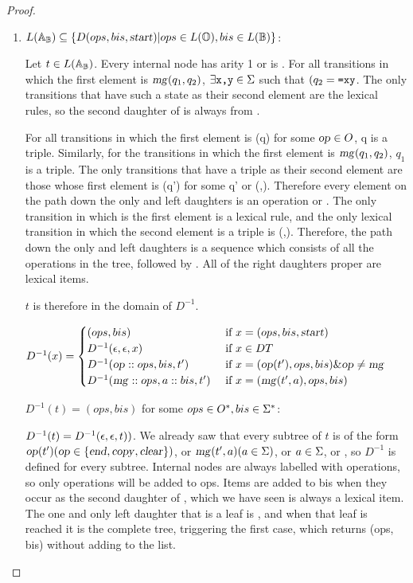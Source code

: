 \documentclass[12pt]{article}
\theoremstyle{definition}
\begin{document}
\begin{proof}
  \begin{enumerate}
  \item
    $L(\mathbb{A}_\mathbb{B})\subseteq\{D(ops,bis,\text{\textsl{start}}) | ops\in L(\mathbb{O}),bis\in
    L(\mathbb{B})\}$: 

    Let $t\in L(\mathbb{A}_\mathbb{B})$. Every internal node has arity 1 or is \mg. For all transitions in which the first element is $\text{\textsl{mg}}(q_1,q_2)$, $\exists \text{\texttt{x,y}}\in\Sigma$ such that  $(q_2=\text{\texttt{=xy}}$. The only transitions that have such a state as their second element are the lexical rules, so the second daughter of \mg is always from \sg.

    For all transitions in which the first element is \op(q) for some $\text{\textsl{op}}\in O$, q is a triple. Similarly, for the transitions in which the first element is $\text{\textsl{mg}}(q_1,q_2)$, $q_1$ is a triple. The only transitions that have a triple as their second element are those whose first element is \op(q') for some q' or (\start,). Therefore every element on the path down the only and left daughters is an operation or \start. The only transition in which \start is the first element is a lexical rule, and the only lexical transition in which the second element is a triple is (\start,). Therefore, the path down the only and left daughters is a sequence which consists of all the operations in the tree, followed by \start.
    All of the right daughters proper are lexical items.

    $t$ is therefore in the domain of $D^{-1}$. 

    $D^{-1}(x) =
    \begin{cases}
      (ops,bis) & \text{ if } x=(ops,bis,\text{\textsl{start}})\\
      D^{-1}(\epsilon,\epsilon,x) & \text{ if } x\in DT\\
      D^{-1}(\text{\textsl{op}}::ops,bis,t') & \text{ if } x = (\text{\textsl{op}}(t'),ops,bis) \& \text{\textsl{op}}\neq\text{\textsl{mg}}\\
      D^{-1}(\text{\textsl{mg}}::ops,a::bis,t') & \text{ if } x = (\text{\textsl{mg}}(t',a),ops,bis)\\
    \end{cases}
    $
    
    $D^{-1}(t) = (ops,bis)$ for some $ops\in O^*, bis\in\Sigma^*$:

    $D^{-1}(t) = D^{-1}(\epsilon,\epsilon,t))$. We already saw that every subtree of $t$ is of the form $\text{\textsl{op}}(t') (\text{\textsl{op}}\in\{\text{\textsl{end}},\text{\textsl{copy}},\text{\textsl{clear}}\})$, or $\text{\textsl{mg}}(t',a) (a\in\Sigma)$, or $a\in\Sigma$, or \start, so  $D^{-1}$ is defined for every subtree. Internal nodes are always labelled with operations, so only operations will be added to ops. Items are added to bis when they occur as the second daughter of \mg, which we have seen is always a lexical item. The one and only left daughter that is a leaf is \start, and when that leaf is reached it is the complete tree, triggering the first case, which returns (ops, bis) without adding \start to the list.


\end{enumerate}
\end{proof}
\end{document}
